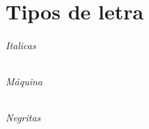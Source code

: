 \part{Tipos de letra}
\paragraph{Italicas}
\textit{\lipsum [1]}
\paragraph{Máquina}
\texttt{\lipsum [2]}
\paragraph{Negritas}
\textbf{\lipsum [3]}